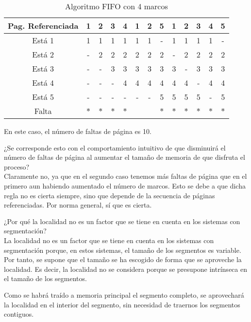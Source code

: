 \begin{ejercicio}
\begin{enumerate}
    \begin{table}[H]
        \centering
        \begin{tabular}{|c||c|c|c|c|c|c|c|c|c|c|c|c|}
            \hline
            Pag. Referenciada & 1 & 2 & 3 & 4 & 1 & 2 & 5 & 1 & 2 & 3 & 4 & 5 \\ \hline \hline
            Está 1            & 1 & 1 & 1 & 1 & 1 & 1 & - & 1 & 1 & 1 & 1 & - \\ \hline
            Está 2            & - & 2 & 2 & 2 & 2 & 2 & 2 & - & 2 & 2 & 2 & 2 \\ \hline
            Está 3            & - & - & 3 & 3 & 3 & 3 & 3 & 3 & - & 3 & 3 & 3 \\ \hline
            Está 4            & - & - & - & 4 & 4 & 4 & 4 & 4 & 4 & - & 4 & 4 \\ \hline
            Está 5            & - & - & - & - & - & - & 5 & 5 & 5 & 5 & - & 5 \\ \hline
            Falta             & $\ast$ & $\ast$ & $\ast$ & $\ast$ &   &   & $\ast$ & $\ast$ & $\ast$ & $\ast$ & $\ast$ & $\ast$ \\ \hline
        \end{tabular}
        \caption{Algoritmo FIFO con 4 marcos}
    \end{table}
    En este caso, el número de faltas de página es 10.
\end{enumerate}
¿Se corresponde esto con el comportamiento intuitivo de que disminuirá el número de faltas de página al aumentar el tamaño de memoria de que disfruta el proceso?\\

Claramente no, ya que en el segundo caso tenemos más faltas de página que en el primero aun habiendo aumentado el número de marcos.
Esto se debe a que dicha regla no es cierta siempre, sino que depende de la secuencia de páginas referenciadas. Por norma general, sí que es cierta.
\end{ejercicio}



\begin{ejercicio}
    ¿Por qué la localidad no es un factor que se tiene en cuenta en los sistemas con segmentación?\\

    La localidad no es un factor que se tiene en cuenta en los sistemas con segmentación porque, en estos sistemas, el tamaño de los segmentos es variable.
    Por tanto, se supone que el tamaño se ha escogido de forma que se aproveche la localidad. Es decir, la localidad no se considera porque se presupone
    intrínseca en el tamaño de los segmentos.

    Como se habrá traído a memoria principal el segmento completo, se aprovechará la localidad en el interior del segmento, sin necesidad de traernos los segmentos contiguos.
\end{ejercicio}


